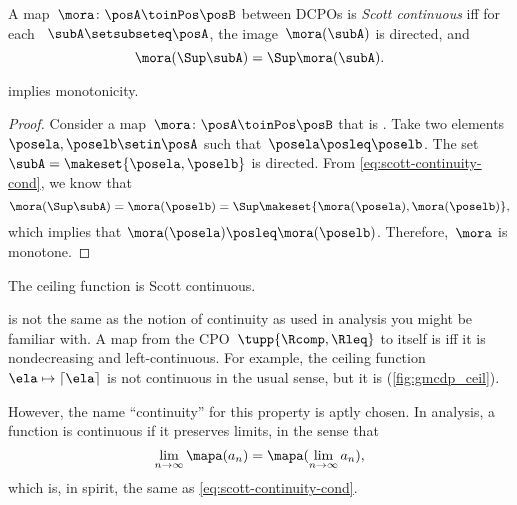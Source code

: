 \begin{definition}
    \label{def:scott}
    A map~$\mora\colon\posA\toinPos\posB$ between DCPOs is \emph{Scott continuous} iff for each ~$\subA\setsubseteq\posA$, the image~$\mora(\subA)$ is directed, and
    \begin{equation}
        \label{eq:scott-continuity-cond}
        \mora(\Sup \subA)=\Sup \mora(\subA).
    \end{equation}
\end{definition}
\begin{lemma}
     implies monotonicity.
\end{lemma}
\begin{proof}
    Consider a map~$\mora\colon\posA\toinPos\posB$ that is .
    Take two elements~$\posela, \poselb \setin \posA$ such that~$\posela\posleq\poselb$.
    The set~$ \subA =  \makeset{\posela, \poselb}$ is directed.
    From \cref{eq:scott-continuity-cond}, we know that
    \begin{equation}
        \mora(\Sup \subA) = \mora(\poselb) = \Sup \makeset{\mora(\posela), \mora(\poselb)},
    \end{equation}
    which implies that $\mora(\posela) \posleq \mora(\poselb)$.
    Therefore,~$\mora$ is monotone.
\end{proof}

\begin{marginfigure}
    \caption{The ceiling function is Scott continuous.}
    \label{fig:gmcdp_ceil}
\end{marginfigure}

\begin{remark}
     is not the same as the notion of continuity as used in analysis you might be familiar with.
    A map from the CPO~$\tupp{\Rcomp,{{\Rleq}}}$ to itself is  iff it is nondecreasing and left-continuous.
    For example, the ceiling function~$\ela \mapsto\left\lceil \ela\right\rceil $ is not continuous in the usual sense, but it is  (\cref{fig:gmcdp_ceil}).

    However, the name ``continuity'' for this property is aptly chosen.
    In analysis, a function is continuous if it preserves limits, in the sense that
    \begin{equation}
        \lim_{n\to\infty}\mapa(a_n) = \mapa(\lim_{n\to\infty}a_n),
    \end{equation}
    which is, in spirit, the same as \cref{eq:scott-continuity-cond}.
\end{remark}

